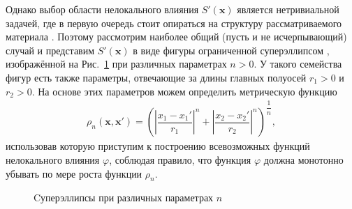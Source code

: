 Однако выбор области нелокального влияния $S'(\boldsymbol{x})$ является нетривиальной задачей, где в первую очередь стоит опираться на структуру рассматриваемого материала \cite{Eringen3}. Поэтому рассмотрим наиболее общий (пусть и не исчерпывающий) случай и представим $S'(\boldsymbol{x})$ в виде фигуры ограниченной суперэллипсом \cite{Superellipse}, изображённой на Рис.~\ref{fig:SuperEllipse} при различных параметрах $n > 0$. У такого семейства фигур есть также параметры, отвечающие за длины главных полуосей $r_1 > 0$ и $r_2 > 0$. На основе этих параметров можем определить метрическую функцию
\begin{gather}
	\label{eq:metricFunction}
	\rho_n(\boldsymbol{x}, \boldsymbol{x}') = 
	\left(
		\left| \dfrac{x_1 - x_1'}{r_1} \right|^n +
		\left| \dfrac{x_2 - x_2'}{r_2} \right|^n
	\right)^{\dfrac{1}{n}},
\end{gather}
использовав которую приступим к построению всевозможных функций нелокального влияния $\varphi$, соблюдая правило, что функция $\varphi$ должна монотонно убывать по мере роста функции $\rho_n$.

\begin{figure}[ht]
    \caption{Cуперэллипсы при различных параметрах $n$}\label{fig:SuperEllipse}
\end{figure}

